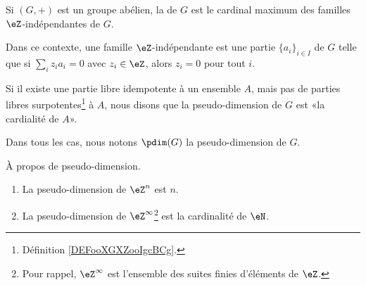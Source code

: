 \begin{definition}		\label{DEFooWQSAooDQYaip}
	Si \( (G,+)\) est un groupe abélien, la	 de \( G\) est le cardinal maximum des familles \( \eZ\)-indépendantes de \( G\).

	Dans ce contexte, une famille \( \eZ\)-indépendante est une partie \( \{ a_i \}_{i\in I}\) de \( G\) telle que si \( \sum_iz_ia_i=0\) avec \( z_i\in \eZ\),  alors \( z_i=0\) pour tout \( i\).

	Si il existe une partie libre idempotente à un ensemble \( A\), mais pas de parties libres surpotentes\footnote{Définition \ref{DEFooXGXZooIgcBCg}.} à \( A\), nous disons que la pseudo-dimension de \( G\) est «la cardialité de \( A\)».

	Dans tous les cas, nous notons \( \pdim(G)\) la pseudo-dimension de \( G\).
\end{definition}

\begin{lemma}		\label{LEMooPASKooFGJgBz}
	À propos de pseudo-dimension.
	\begin{enumerate}
		\item
		      La pseudo-dimension de \( \eZ^n\) est \( n\).
		\item
		      La pseudo-dimension de \( \eZ^{\infty}\)\footnote{Pour rappel, \( \eZ^{\infty}\) est l'ensemble des suites finies d'éléments de \( \eZ\).} est la cardinalité de \( \eN\).
	\end{enumerate}
\end{lemma}

